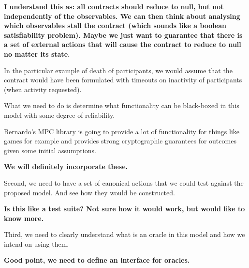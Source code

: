 \documentclass[
      acmsmall
    , screen
    , review=true
  ]{acmart}
\begin{document}
{\bf
I understand this as: all contracts should reduce to null, but not independently of the observables. We can then think about analysing which observables stall the contract (which sounds like a boolean satisfiability problem). Maybe we just want to guarantee that there is a set of external actions that will cause the contract to reduce to null no matter its state.


In the particular example of death of participants, we would assume that the contract would have been formulated with timeouts on inactivity of participants (when activity requested).
}

What we need to do is determine what functionality can be black-boxed in this model with some degree of reliability.


Bernardo's MPC library is going to provide a lot of functionality for things like games for example and provides strong cryptographic guarantees for outcomes given some initial assumptions.

{\bf
We will definitely incorporate these.
}

Second, we need to have a set of canonical actions that we could test against the proposed model. And see how they would be constructed.

{\bf
Is this like a test suite? Not sure how it would work, but would like to know more.
}

Third, we need to clearly understand what is an oracle in this model and how we intend on using them.





{\bf
Good point, we need to define an interface for oracles.
}





















\clearpage


\end{document}
